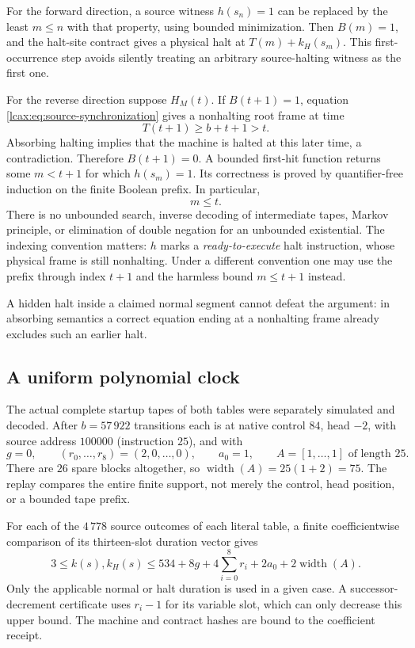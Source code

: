 For the forward direction, a source witness $h(s_n)=1$ can be replaced by
the least $m\le n$ with that property, using bounded minimization.  Then
$B(m)=1$, and the halt-site contract gives a physical halt at
$T(m)+k_H(s_m)$.  This first-occurrence step avoids silently treating an
arbitrary source-halting witness as the first one.

For the reverse direction suppose $H_M(t)$.  If $B(t+1)=1$, equation
\eqref{lcax:eq:source-synchronization} gives a nonhalting root frame at time
\[
 T(t+1)\ge b+t+1>t.
\]
Absorbing halting implies that the machine is halted at this later time,
a contradiction.  Therefore $B(t+1)=0$.  A bounded first-hit function
returns some $m<t+1$ for which $h(s_m)=1$.  Its correctness is proved by
quantifier-free induction on the finite Boolean prefix.  In particular,
\[
 m\le t.
\]
There is no unbounded search, inverse decoding of intermediate tapes,
Markov principle, or elimination of double negation for an unbounded
existential.  The indexing convention matters: $h$ marks a
\emph{ready-to-execute} halt instruction, whose physical frame is still
nonhalting.  Under a different convention one may use the prefix through
index $t+1$ and the harmless bound $m\le t+1$ instead.

A hidden halt inside a claimed normal segment cannot defeat the
argument: in absorbing semantics a correct equation ending at a
nonhalting frame already excludes such an earlier halt.

\subsection{A uniform polynomial clock}

The actual complete startup tapes of both tables were separately
simulated and decoded.  After $b=57\,922$ transitions each is at native
control $84$, head $-2$, with source address $100000$ (instruction $25$),
and with
\[
 g=0,\qquad (r_0,\ldots,r_8)=(2,0,\ldots,0),
 \qquad a_0=1,\qquad A=[1,\ldots,1]\text{ of length }25.
\]
There are $26$ spare blocks altogether, so
$\operatorname{width}(A)=25(1+2)=75$.
The replay compares the entire finite support, not merely the control,
head position, or a bounded tape prefix.

For each of the $4\,778$ source outcomes of each literal table, a finite
coefficientwise comparison of its thirteen-slot duration vector gives
\[
 3\le k(s),k_H(s)\le
 534+8g+4\sum_{i=0}^{8}r_i+2a_0+2\operatorname{width}(A).
 \tag{D$_H$}\label{lcax:eq:affine-duration-envelope}
\]
Only the applicable normal or halt duration is used in a given case.
A successor-decrement certificate uses $r_i-1$ for its variable slot,
which can only decrease this upper bound.  The machine and contract
hashes are bound to the coefficient receipt.

